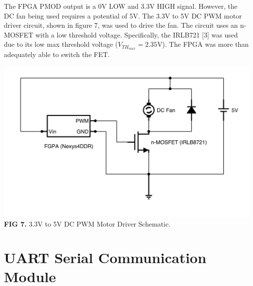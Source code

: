 \documentclass{article}
\begin{document}
The FPGA PMOD output is a 0V LOW and 3.3V HIGH signal. However, the DC fan being used requires a potential of 5V. The 3.3V to 5V DC PWM motor driver circuit, shown in figure 7, was used to drive the fan. The circuit uses an n-MOSFET with a low threshold voltage. Specifically, the IRLB721 [3] was used due to its low max threshold voltage ($V_{TH_{max}}=2.35$V). The FPGA was more than adequately able to switch the FET.

\begin{center}
\includegraphics[scale=.5]{images/pwmSchematic-nowords}\\
\textbf{FIG 7.} 3.3V to 5V DC PWM Motor Driver Schematic.\\
\end{center}
\section{UART Serial Communication Module}
\end{document}
